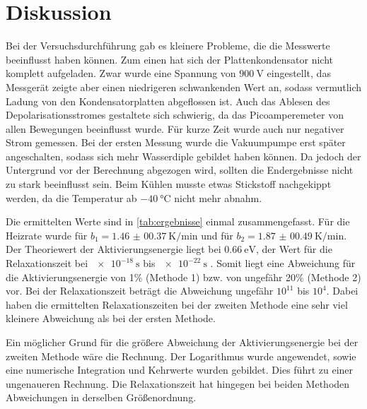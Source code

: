 \section{Diskussion}
\label{sec:Diskussion}

Bei der Versuchsdurchführung gab es kleinere Probleme, die die Messwerte beeinflusst haben können.
Zum einen hat sich der Plattenkondensator nicht komplett aufgeladen.
Zwar wurde eine Spannung von $\SI{900}{\volt}$ eingestellt, das Messgerät zeigte aber einen niedrigeren schwankenden Wert an, sodass vermutlich Ladung 
von den Kondensatorplatten abgeflossen ist.
Auch das Ablesen des Depolarisationsstromes gestaltete sich schwierig, da das Picoamperemeter von allen Bewegungen beeinflusst wurde. 
Für kurze Zeit wurde auch nur negativer Strom gemessen.
Bei der ersten Messung wurde die Vakuumpumpe erst später angeschalten, sodass sich mehr Wasserdiple gebildet haben können. Da jedoch der Untergrund 
vor der Berechnung abgezogen wird, sollten die Endergebnisse nicht zu stark beeinflusst sein. 
Beim Kühlen musste etwas Stickstoff nachgekippt werden, da die Temperatur ab $\SI{-40}{\celsius}$ nicht mehr abnahm.

\noindent
Die ermittelten Werte sind in \autoref{tab:ergebnisse} einmal zusammengefasst.
Für die Heizrate wurde für $b_1 = \SI{1.46(0037)}{\kelvin\per\minute}$ und für $b_2 = \SI{1.87(0049)}{\kelvin\per\minute}$.
Der Theoriewert der Aktivierungsenergie liegt bei $\SI{0.66}{\electronvolt}$, der Wert für die Relaxationszeit bei $\SI{e-18}{\second}$ bis $\SI{e-22}{\second}$ \cite{muccillo}.
Somit liegt eine Abweichung für die Aktivierungsenergie von 1\% (Methode 1) bzw. von ungefähr 20\% (Methode 2) vor.
Bei der Relaxationszeit beträgt die Abweichung ungefähr $10^{11}$ bis $10^{4}$.
Dabei haben die ermittelten Relaxationszeiten bei der zweiten Methode eine sehr viel kleinere Abweichung als bei der ersten Methode.

\noindent
Ein möglicher Grund für die größere Abweichung der Aktivierungsenergie bei der zweiten Methode wäre die Rechnung.
Der Logarithmus wurde angewendet, sowie eine numerische Integration und Kehrwerte wurden gebildet.
Dies führt zu einer ungenaueren Rechnung.
Die Relaxationszeit hat hingegen bei beiden Methoden Abweichungen in derselben Größenordnung.

